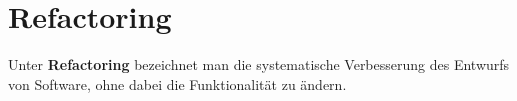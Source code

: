 \section{Refactoring}

\begin{tcolorbox}[title=Refactoring]
Unter \textbf{Refactoring} bezeichnet man die systematische Verbesserung des Entwurfs von Software, ohne dabei die Funktionalität zu ändern.
\end{tcolorbox}